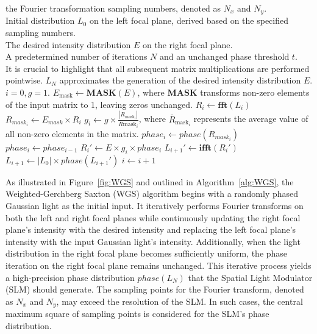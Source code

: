 \documentclass[11pt]{article}
\begin{document}
\begin{algorithm} 
	\caption{WGS Algorithm} 
	\label{alg:WGS} 
	\begin{algorithmic}
		\REQUIRE  
  the Fourier transformation sampling numbers, denoted as $N_x$ and $N_y$. \\
  Initial distribution $L_0$ on the left focal plane, derived based on the specified sampling numbers.\\
  The desired intensity distribution $E$ on the right focal plane.\\
  A predetermined number of iterations $N$ and an unchanged phase threshold $t$. \\
  It is crucial to highlight that all subsequent matrix multiplications are performed pointwise.
		\ENSURE $L_N$ approximates the generation of the desired intensity distribution $E$.
        \STATE $i = 0, g = 1$.
        \STATE $E_{\text{mask}} \gets \mathbf{MASK}(E)$, where $\mathbf{MASK}$ transforms non-zero elements of the input matrix to 1, leaving zeros unchanged.
		\STATE $R_i \gets \mathbf{fft}(L_i)$ 
        \STATE $R_{mask_i} \gets E_{mask} \times R_i$ 
        \STATE $g_i \gets g \times \frac{|R_{\text{mask}_i}|}{\bar{R}{\text{mask}_i}}$, where $\bar{R}_{\text{mask}_i}$ represents the average value of all non-zero elements in the matrix.
        \STATE $phase_i \gets phase(R_{mask_i})$
        \ELSE
        \STATE $phase_i \gets phase_{i - 1}$
        \ENDIF 
        \STATE $R_i' \gets E\times g_i \times phase_i$
        \STATE  $L_{i+1}' \gets \mathbf{ifft}(R_i')$ 
        \STATE  $L_{i+1} \gets |L_0|\times phase(L_{i+1}')$ 
        \STATE $i \gets i+1$
        \ENDWHILE 
	\end{algorithmic} 
\end{algorithm}

 As illustrated in Figure~\ref{fig:WGS} and outlined in Algorithm~\ref{alg:WGS}, the Weighted-Gerchberg Saxton (WGS) algorithm begins with a randomly phased Gaussian light as the initial input. It iteratively performs Fourier transforms on both the left and right focal planes while continuously updating the right focal plane's intensity with the desired intensity and replacing the left focal plane's intensity with the input Gaussian light's intensity. Additionally, when the light distribution in the right focal plane becomes sufficiently uniform, the phase iteration on the right focal plane remains unchanged. This iterative process yields a high-precision phase distribution $phase(L_N)$ that the Spatial Light Modulator (SLM) should generate. The sampling points for the Fourier transform, denoted as $N_x$ and $N_y$, may exceed the resolution of the SLM. In such cases, the central maximum square of sampling points is considered for the SLM's phase distribution.
\end{document}
